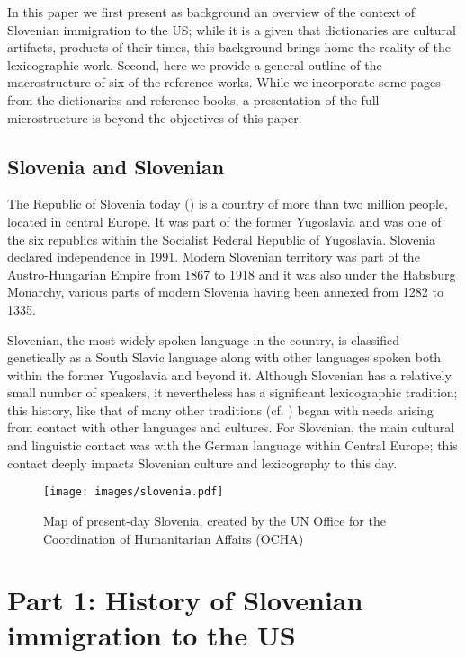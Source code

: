 \documentclass[output=paper,colorlinks,citecolor=brown,arabicfont,chinesefont]{langscibook}
\begin{document}
In this paper we first present as background an overview of the context of Slovenian immigration to the US; while it is a given that dictionaries are cultural artifacts, products of their times, this background brings home the reality of the lexicographic work. Second, here we provide a general outline of the macrostructure of six of the reference works. While we incorporate some pages from the dictionaries and reference books, a presentation of the full microstructure is beyond the objectives of this paper. 

\subsection{Slovenia and Slovenian}

The Republic of Slovenia today () is a country of more than two million people, located in central Europe. It was part of the former Yugoslavia and was one of the six republics within the  Socialist Federal Republic of Yugoslavia. Slovenia declared independence in 1991. Modern Slovenian territory was part of the Austro-Hungarian Empire from 1867 to 1918 and it was also under the Habsburg Monarchy, various parts of modern Slovenia having been annexed from 1282 to 1335. 

Slovenian, the most widely spoken language in the country, is classified genetically as a South Slavic language along with other languages spoken both within the former Yugoslavia and beyond it. Although Slovenian has a relatively small number of speakers, it nevertheless has a significant lexicographic tradition; this history, like that of many other traditions (cf. \citealt{Bejoint2016, Farina2009, Fontenelle2016}) began with needs arising from contact with other languages and cultures. For Slovenian, the main cultural and linguistic contact was with the German language within Central Europe; this contact deeply impacts Slovenian culture and lexicography to this day.

\begin{figure}
\texttt{[image: images/slovenia.pdf]}
\caption{Map of present-day Slovenia, created by the UN Office for the Coordination of Humanitarian Affairs (OCHA)}
\label{vrbinc:fig1}
\end{figure}

\section{Part 1: History of Slovenian immigration to the US}
\end{document}
